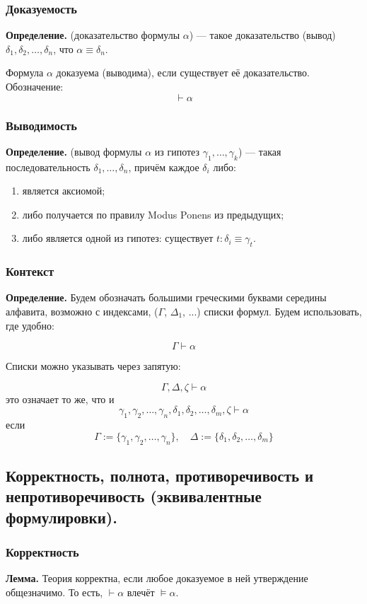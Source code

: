 \documentclass[10pt,a4paper,oneside]{article}
\begin{document}
\subsubsection{Доказуемость}
\noindent \textbf{ Определение. }
(доказательство формулы $\alpha$)
--- такое доказательство (вывод) $\delta_1, \delta_2, \dots, \delta_n$,
что $\alpha\equiv\delta_n$.

Формула $\alpha$ доказуема (выводима), если существует её доказательство. Обозначение:
$$\vdash \alpha$$

\subsubsection{Выводимость}
\noindent \textbf{ Определение. }
(вывод формулы $\alpha$ из гипотез $\gamma_1,\dots,\gamma_k$)
    --- такая последовательность
    $\delta_1,\dots,\delta_n$, причём каждое $\delta_i$ либо:
    \begin{enumerate}
    \item является аксиомой;
    \item либо получается по правилу Modus Ponens из предыдущих;
    \item либо является одной из гипотез: существует $t: \delta_i \equiv \gamma_t$.
    \end{enumerate}

\subsubsection{Контекст}
\noindent \textbf{ Определение. }
Будем обозначать большими греческими буквами середины
алфавита, возможно с индексами, ($\Gamma$, $\Delta_1$, ...) списки формул.
Будем использовать, где удобно:

$$\Gamma \vdash \alpha$$

Списки можно указывать через запятую:

$$\Gamma, \Delta, \zeta \vdash \alpha$$
это означает то же, что и 
$$\gamma_1,\gamma_2,\dots,\gamma_n,\delta_1,\delta_2,\dots,\delta_m,\zeta\vdash\alpha$$
если 
$$\Gamma := \{\gamma_1,\gamma_2,\dots,\gamma_n\},\quad \Delta := \{\delta_1,\delta_2,\dots,\delta_m\}$$


\subsection{Корректность, полнота, противоречивость и непротиворечивость (эквивалентные формулировки).}

\subsubsection{Корректность}
\textbf{ Лемма. }
Теория корректна, если любое доказуемое в ней утверждение общезначимо.
То есть, $\vdash\alpha$ влечёт $\models\alpha$.
\end{document}
